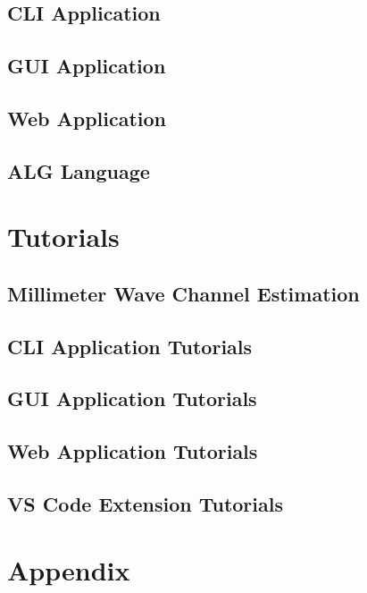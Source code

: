 \documentclass[use boldface]{beaulivre}
\begin{document}
\chapter{CLI Application}


\chapter{GUI Application}


\chapter{Web Application}


\chapter{ALG Language}


\part{Tutorials}

\chapter{Millimeter Wave Channel Estimation}


\chapter{CLI Application Tutorials}
\chapter{GUI Application Tutorials}
\chapter{Web Application Tutorials}
\chapter{VS Code Extension Tutorials}

\appendix

\cleardoublepage
\cleardoublepage
{}
{}
\part*{Appendix}
\end{document}
